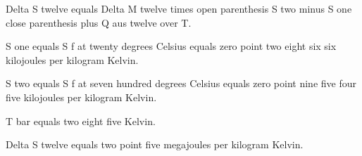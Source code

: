 Delta S twelve equals Delta M twelve times open parenthesis S two minus S one close parenthesis plus Q aus twelve over T.

S one equals S f at twenty degrees Celsius equals zero point two eight six six kilojoules per kilogram Kelvin.

S two equals S f at seven hundred degrees Celsius equals zero point nine five four five kilojoules per kilogram Kelvin.

T bar equals two eight five Kelvin.

Delta S twelve equals two point five megajoules per kilogram Kelvin.